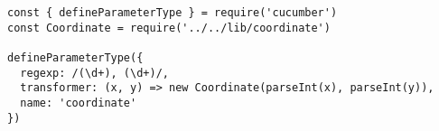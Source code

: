 \begin{verbatim}
const { defineParameterType } = require('cucumber')
const Coordinate = require('../../lib/coordinate')

defineParameterType({
  regexp: /(\d+), (\d+)/,
  transformer: (x, y) => new Coordinate(parseInt(x), parseInt(y)),
  name: 'coordinate'
})
\end{verbatim}